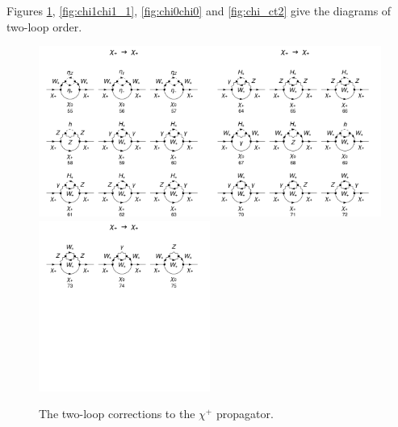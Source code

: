 \documentclass[11pt]{article}
\begin{document}
Figures \ref{fig:chi1chi1_2}, \ref{fig:chi1chi1_1}, \ref{fig:chi0chi0} and \ref{fig:chi_ct2} give the diagrams of two-loop order.
\begin{figure}[h!]
\center
\includegraphics[width=0.5\textwidth]{diagrams_F[1]_2_7.pdf}\includegraphics[width=0.5\textwidth]{diagrams_F[1]_2_8.pdf}
\includegraphics[width=0.5\textwidth]{diagrams_F[1]_2_9.pdf}
\caption{The two-loop corrections to the $\chi^+$ propagator.}\label{fig:chi1chi1_2}
\end{figure}
\end{document}
